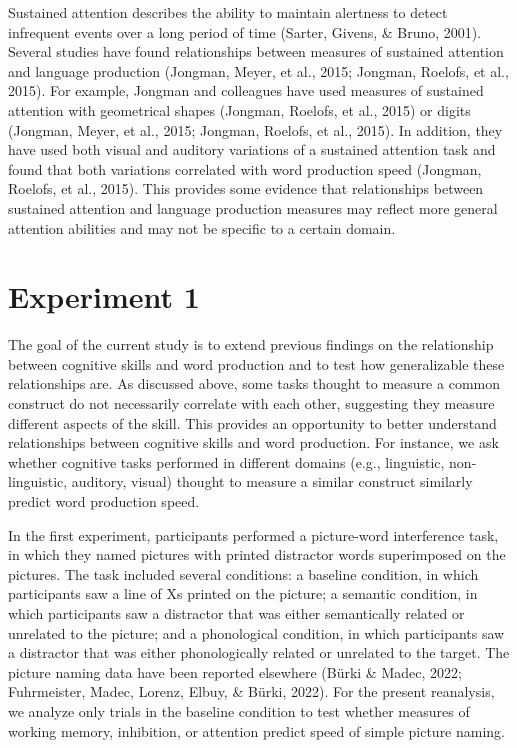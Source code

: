\documentclass[
  man,floatsintext]{apa6}
\begin{document}
Sustained attention describes the ability to maintain alertness to detect infrequent events over a long period of time (Sarter, Givens, \& Bruno, 2001). Several studies have found relationships between measures of sustained attention and language production (Jongman, Meyer, et al., 2015; Jongman, Roelofs, et al., 2015). For example, Jongman and colleagues have used measures of sustained attention with geometrical shapes (Jongman, Roelofs, et al., 2015) or digits (Jongman, Meyer, et al., 2015; Jongman, Roelofs, et al., 2015). In addition, they have used both visual and auditory variations of a sustained attention task and found that both variations correlated with word production speed (Jongman, Roelofs, et al., 2015). This provides some evidence that relationships between sustained attention and language production measures may reflect more general attention abilities and may not be specific to a certain domain.

\hypertarget{experiment-1}{%
\section{Experiment 1}\label{experiment-1}}

The goal of the current study is to extend previous findings on the relationship between cognitive skills and word production and to test how generalizable these relationships are. As discussed above, some tasks thought to measure a common construct do not necessarily correlate with each other, suggesting they measure different aspects of the skill. This provides an opportunity to better understand relationships between cognitive skills and word production. For instance, we ask whether cognitive tasks performed in different domains (e.g., linguistic, non-linguistic, auditory, visual) thought to measure a similar construct similarly predict word production speed.

In the first experiment, participants performed a picture-word interference task, in which they named pictures with printed distractor words superimposed on the pictures. The task included several conditions: a baseline condition, in which participants saw a line of Xs printed on the picture; a semantic condition, in which participants saw a distractor that was either semantically related or unrelated to the picture; and a phonological condition, in which participants saw a distractor that was either phonologically related or unrelated to the target. The picture naming data have been reported elsewhere (Bürki \& Madec, 2022; Fuhrmeister, Madec, Lorenz, Elbuy, \& Bürki, 2022). For the present reanalysis, we analyze only trials in the baseline condition to test whether measures of working memory, inhibition, or attention predict speed of simple picture naming.
\end{document}
